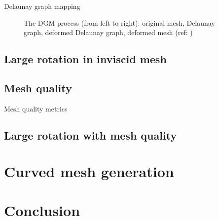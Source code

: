 \documentclass[t,12pt]{beamer}
\begin{document}
\begin{frame}{Delaunay graph mapping}
\begin{figure}
{ 	}
 	\caption{The DGM process (from left to right): original mesh, Delaunay graph, deformed Delaunay graph, deformed mesh (ref: )}
 	\label{fig:dgmprocess}
 \end{figure}
\end{frame}

\subsection{Large rotation in inviscid mesh}

\subsection{Mesh quality}
\begin{frame}{Mesh quality metrics}
\end{frame}

\subsection{Large rotation with mesh quality}

\section{Curved mesh generation}

\section{Conclusion}
\end{document}
